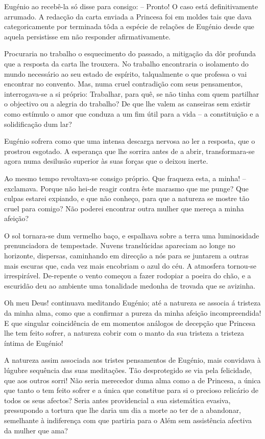 \documentclass[9pt]{article}
\begin{document}
Eugé\-nio ao recebê-la só disse para consigo: -- Pronto! O caso está
definitivamente arrumado. A redac\-ção da carta enviada a Princesa foi
em moldes tais que dava categoricamente por terminada tôda a espécie de
rela\-ções de Eugé\-nio desde que aquela persistisse em não responder afirmativamente.

Procuraria no traba\-lho o esquecimento do passado, a mitiga\-ção da dôr
profunda que a resposta da carta lhe trouxera. No traba\-lho encontraria
o isolamento do mundo necessário ao seu estado de espírito, talqualmente
o que professa o vai encontrar no convento. Mas, numa cruel contradi\-ção
com seus pensamentos, interrogava-se a si próprio: Traba\-lhar, para quê,
se não tinha com quem parti\-lhar o objectivo ou a alegria do traba\-lho? De
que lhe valem as canseiras sem existir como estímulo o amor que conduza
a um fim útil para a vida -- a constitui\-ção e a solidifi\-ca\-ção dum
lar?

Eugé\-nio sofrera como que uma intensa descarga nervosa ao ler a resposta, que o prostrou esgotado. A esperan\-ça que lhe sorrira antes de a abrir,
transformara-se agora numa desilusão superior às suas forças que o deixou inerte.

Ao mesmo tempo revoltava-se consigo próprio. Que fraqueza esta, a
minha! -- exclamava. Porque não hei-de reagir contra êste marasmo que me
punge? Que culpas estarei expiando, e que não conheço, para que a natureza se mostre tão cruel para comigo? Não poderei encontrar outra mu\-lher que mereça a minha afei\-ção?

O sol tornara-se dum verme\-lho baço, e espa\-lhava sobre a terra uma
luminosidade prenunciadora de tempestade. Nuvens translúcidas apareciam
ao longe no horizonte, dispersas, caminhando em direc\-ção a nós para se juntarem a outras mais escuras que, cada vez mais encobriam o azul do céu.
A atmosfera tornou-se irrespirável. De-repente o vento começou a fazer
rodopiar a poeira do chão, e a escuridão deu ao ambiente uma tonalidade
medonha de trovada que se avizinha.

Oh meu Deus! continuava meditando Eugé\-nio; até a natureza se associa
á tristeza da minha alma, como que a confirmar a pureza da minha afei\-ção
incompreendida! E que singular coincidên\-cia de em momentos análogos de
decep\-ção que Princesa lhe tem feito sofrer, a natureza cobrir com o manto
da sua tristeza a tristeza íntima de Eugé\-nio!

A natureza assim associada aos tristes pensamentos de Eugé\-nio, mais
convidava à lúgubre sequência das suas medita\-ções. Tão desprotegido
se via pela felicidade, que aos outros sorri! Não seria merecedor duma
alma como a de Princesa, a única que tanto o tem feito sofrer e a única
que constitue para si o precioso relicário de todos os seus afectos?
Seria antes providencial a sua sistemática evasiva, pressupondo a tortura
que lhe daria um dia a morte ao ter de a abandonar, seme\-lhante à indiferença com que partiria para o Além sem assistência afectiva da mu\-lher
que ama?
\end{document}
